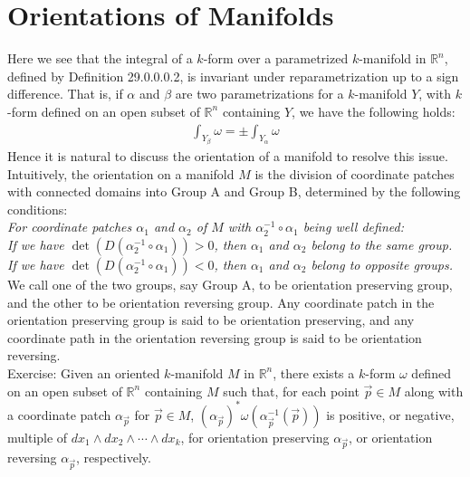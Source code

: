 \documentclass[11pt,oneside]{book}
\theoremstyle{break}
\theoremstyle{break}
\newcommand{\R}{\mathbb{R}}
\newcommand{\exercise}{\color{green}Exercise: \color{black}}
\begin{document}
\section[Orientations of Manifolds]{\color{red} Orientations of Manifolds\color{black}}
Here we see that the integral of a $k$-form over a parametrized $k$-manifold in $\R^n$, defined by Definition 29.0.0.0.2, is invariant under reparametrization up to a sign difference. That is, if $\alpha$ and $\beta$ are two parametrizations for a $k$-manifold $Y$, with $k$-form defined on an open subset of $\R^n$ containing $Y$, we have the following holds:
\begin{align*}
\int_{Y_\beta} \omega = \pm \int_{Y_\alpha} \omega
\end{align*}
Hence it is natural to discuss the orientation of a manifold to resolve this issue. Intuitively, the orientation on a manifold $M$ is the division of coordinate patches with connected domains into Group A and Group B, determined by the following conditions:\\

\textit{For coordinate patches $\alpha_1$ and $\alpha_2$ of $M$ with $\alpha_2^{-1} \circ \alpha_1$ being well defined: \\
If we have $\det(D(\alpha_2^{-1} \circ \alpha_1))>0$, then $\alpha_1$ and $\alpha_2$ belong to the same group. \\
If we have $\det(D(\alpha_2^{-1} \circ \alpha_1))<0$, then $\alpha_1$ and $\alpha_2$ belong to opposite groups. }\\

We call one of the two groups, say Group A, to be orientation preserving group, and the other to be orientation reversing group. Any coordinate patch in the orientation preserving group is said to be orientation preserving, and any coordinate path in the orientation reversing group is said to be orientation reversing. \\

\exercise Given an oriented $k$-manifold $M $ in $\R^n$, there exists a $k$-form $\omega$ defined on an open subset of $\R^n$ containing $M$ such that, for each point $\vec{p}\in M$ along with a coordinate patch $\alpha_{\vec{p}}$ for $\vec{p}\in M$, $(\alpha_{\vec{p}})^*\omega(\alpha_{\vec{p}}^{-1}(\vec{p}))$ is positive, or negative, multiple of $dx_1\wedge dx_2 \wedge \cdots \wedge dx_k$, for orientation preserving $\alpha_{\vec{p}}$, or orientation reversing $\alpha_{\vec{p}}$, respectively.\\
\end{document}
